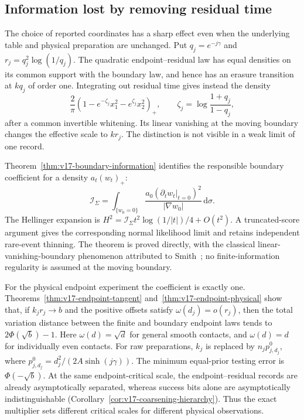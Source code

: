 \subsection{Information lost by removing residual time}
The choice of reported coordinates has a sharp effect even when the
underlying table and physical preparation are unchanged. Put
$q_j=e^{-j\gamma}$ and $r_j=q_j^2\log(1/q_j)$. The quadratic
endpoint--residual law has equal densities on its common support with
the boundary law, and hence has an erasure transition at $kq_j$ of
order one. Integrating out residual time gives instead the density
\[
 \frac2\pi(1-e^{-\zeta_j}x_1^2-e^{\zeta_j}x_2^2)_+,
 \qquad \zeta_j=\log\frac{1+q_j}{1-q_j},
\]
after a common invertible whitening. Its linear vanishing at the moving
boundary changes the effective scale to $kr_j$. The distinction is not
visible in a weak limit of one record.

Theorem~\ref{thm:v17-boundary-information} identifies the responsible
boundary coefficient for a density $a_t(w_t)_+$:
\[
 \mathcal I_\Sigma=
 \int_{\{w_0=0\}}
       \frac{a_0(\partial_t w_t|_{t=0})^2}{|\nabla w_0|}\,\mathrm d\sigma.
\]
The Hellinger expansion is
$H^2=\mathcal I_\Sigma t^2\log(1/|t|)/4+O(t^2)$.
A truncated-score argument gives the corresponding normal likelihood
limit and retains independent rare-event thinning. The theorem is proved
directly, with the classical linear-vanishing-boundary phenomenon
attributed to Smith~\cite{Smith1985}; no finite-information regularity
is assumed at the moving boundary.

For the physical endpoint experiment the coefficient is exactly one.
Theorems~\ref{thm:v17-endpoint-tangent}
and~\ref{thm:v17-endpoint-physical} show that, if
$k_jr_j\to b$ and the positive offsets satisfy
$\omega(d_j)=o(r_j)$, then the total variation distance between the
finite and boundary endpoint laws tends to $2\Phi(\sqrt b)-1$.
Here $\omega(d)=\sqrt d$ for general smooth contacts, and $\omega(d)=d$
for individually even contacts. For raw preparations, $k_j$ is replaced
by $n_jp_{j,d_j}^0$, where $p_{j,d_j}^0=d_j^2/(2A\sinh(j\gamma))$.
The minimum equal-prior testing error is $\Phi(-\sqrt b)$.
At the same endpoint-critical scale, the endpoint--residual records are
already asymptotically separated, whereas success bits alone are
asymptotically indistinguishable
(Corollary~\ref{cor:v17-coarsening-hierarchy}). Thus the exact multiplier
sets different critical scales for different physical observations.

